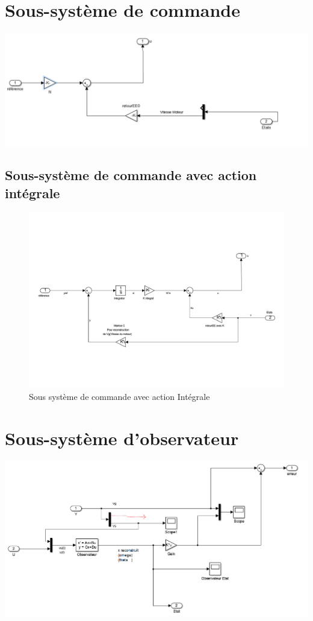 \section*{Sous-système de commande}
\includegraphics[width = \textwidth]{./annexes/annexe2/Command.PNG}
\subsection*{Sous-système de commande avec action intégrale}
\begin{figure}
\includegraphics[width = \textwidth]{./annexes/annexe2/Command_RI.pdf}
\caption{Sous système de commande avec action Intégrale\label{fig:sousSystemeRI}}
\end{figure}

\section*{Sous-système d'observateur}
\includegraphics[width = \textwidth]{./annexes/annexe2/Observateur.PNG}